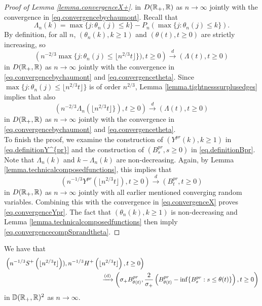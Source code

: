 \begin{proof}[Proof of Lemma \ref{lemma.convergenceX+}]
  in $D({\mathbb R}_+,{\mathbb R})$ as $n\to \infty$ jointly with the convergence in \eqref{eq.convergencebychaumont}.
Recall that 
$$\Lambda_n(k)=\max\{j:\theta_n(j)\leq k\}-P_n(\max\{j:\theta_n(j)\leq k\}). $$ By definition, for all $n$, $(\theta_n(k),k\geq 1)$ and $(\theta(t),t\geq 0)$ are strictly increasing, so
$$\left(n^{-2/3}\max\{j:\theta_n(j)\leq \lfloor n^{2/3} t \rfloor\} ),t\geq 0\right)\overset{d}{\to}\left( \Lambda(t),t\geq0 \right)$$
in $D({\mathbb R}_+,{\mathbb R})$ as $n\to \infty$ jointly with the convergence in \eqref{eq.convergencebychaumont} and \eqref{eq.convergencetheta}. Since $\max\{j:\theta_n(j)\leq \lfloor n^{2/3} t \rfloor\}$ is of order $n^{2/3}$, Lemma \ref{lemma.tightnesssurplusedges} implies that also 
$$\left(n^{-2/3}\Lambda_n\left(\lfloor n^{2/3} t \rfloor\} \right),t\geq 0\right)\overset{d}{\to}\left( \Lambda(t),t\geq0 \right)$$
in $D({\mathbb R}_+,{\mathbb R})$ as $n\to \infty$ jointly with the convergence in \eqref{eq.convergencebychaumont} and \eqref{eq.convergencetheta}.\\
To finish the proof, we examine the construction of $(Y^{pr}(k),k\geq 1)$ in \eqref{eq.definitionY^{pr}} and the construction of $(B^{pr}_s,s\geq 0)$ in \eqref{eq.definitionBpr}. 
Note that $\Lambda_n(k)$ and $k-\Lambda_n(k)$ are non-decreasing. Again, by Lemma \ref{lemma.technicalcomposedfunctions}, this implies that 
$$\left(n^{-1/3}Y^{pr}\left( \lfloor n^{2/3} t \rfloor \right), t\geq 0 \right)\overset{d}{\to} \left( B^{pr}_{t}, t\geq 0\right)$$
in $D({\mathbb R}_+,{\mathbb R})$ as $n\to \infty$ jointly with all earlier mentioned converging random variables. Combining this with the convergence in \eqref{eq.convergenceX} proves \eqref{eq.convergenceYpr}. The fact that $(\theta_n(k),k\geq 1)$ is non-decreasing and Lemma \ref{lemma.technicalcomposedfunctions} then imply \eqref{eq.convergencecompSprandtheta}. 
\end{proof}

\begin{lemma}\label{lemma.subtracterrorconverges}
We have that 
\begin{align*}
& \left(n^{-1/3}S^{+}\left(\lfloor n^{2/3}t\rfloor \right)), n^{-1/3}H^{+}\left(\lfloor n^{2/3}t\rfloor \right) ,t\geq 0 \right) \\
& \hspace{15em} \todist \left(\sigma_+ B^{pr}_{\theta (t)},\frac{2}{\sigma_+} \left(B^{pr}_{\theta (t)}-\inf\{B^{pr}_{s}:s\leq \theta(t)\}\right) ,t\geq 0 \right)
\end{align*}
in ${\mathbb D}({\mathbb R}_+,{\mathbb R})^2$ as $n\to \infty$. 
\end{lemma}


